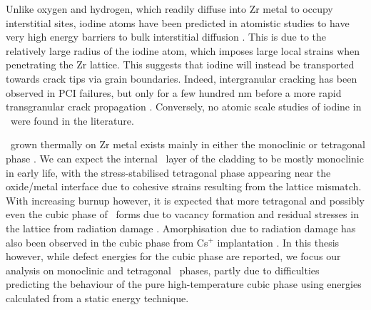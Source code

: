 Unlike oxygen and hydrogen, which readily diffuse into Zr metal to occupy interstitial sites, iodine atoms have been predicted in atomistic studies to have very high energy barriers to bulk interstitial diffusion \cite{rossi2015first,legris2005ab,carlot2002energetically}. This is due to the relatively large radius of the iodine atom, which imposes large local strains when penetrating the Zr lattice. This suggests that iodine will instead be transported towards crack tips via grain boundaries. Indeed, intergranular cracking has been observed in PCI failures, but only for a few hundred nm before a more rapid transgranular crack propagation \cite{fregonese2000failure}. Conversely, no atomic scale studies of iodine in \zirconia\ were found in the literature.  

\zirconia\ grown thermally on Zr metal exists mainly in either the monoclinic or tetragonal phase \cite{Howard1988,teufer1962crystal}. We can expect the internal \zirconia\ layer of the cladding to be mostly monoclinic in early life, with the stress-stabilised tetragonal phase appearing near the oxide/metal interface due to cohesive strains resulting from the lattice mismatch. With increasing burnup however, it is expected that more tetragonal and possibly even the cubic phase of \zirconia\ forms due to vacancy formation and residual stresses in the lattice from radiation damage \cite{sickafus1999radiation}. Amorphisation due to radiation damage has also been observed in the cubic phase from Cs$^{+}$ implantation \cite{amorphization2000wang}. In this thesis however, while defect energies for the cubic phase are reported, we focus our analysis on monoclinic and tetragonal \zirconia\ phases, partly due to difficulties predicting the behaviour of the pure high-temperature cubic phase using energies calculated from a static energy technique. 

